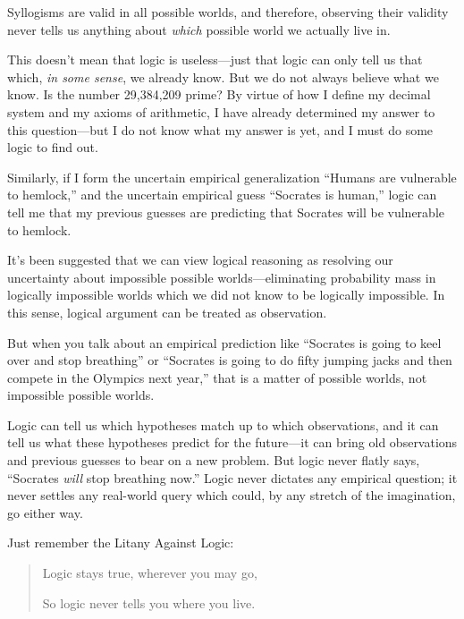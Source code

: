{{{
 Syllogisms are valid in all possible worlds, and therefore,
observing their validity never tells us anything about \textit{which}
possible world we actually live in.}

{
 This doesn't mean that logic is useless---just
that logic can only tell us that which, \textit{in some sense}, we
already know. But we do not always believe what we know. Is the number
29,384,209 prime? By virtue of how I define my decimal system and my
axioms of arithmetic, I have already determined my answer to this
question---but I do not know what my answer is yet, and I must do some
logic to find out.}

{
 Similarly, if I form the uncertain empirical generalization
``Humans are vulnerable to
hemlock,'' and the uncertain empirical guess
``Socrates is human,'' logic can
tell me that my previous guesses are predicting that Socrates will be
vulnerable to hemlock.}

{
 It's been suggested that we can view logical
reasoning as resolving our uncertainty about impossible possible
worlds---eliminating probability mass in logically impossible worlds
which we did not know to be logically impossible. In this sense,
logical argument can be treated as observation.}

{
 But when you talk about an empirical prediction like
``Socrates is going to keel over and stop
breathing'' or ``Socrates is going
to do fifty jumping jacks and then compete in the Olympics next
year,'' that is a matter of possible worlds, not
impossible possible worlds.}

{
 Logic can tell us which hypotheses match up to which observations,
and it can tell us what these hypotheses predict for the future---it
can bring old observations and previous guesses to bear on a new
problem. But logic never flatly says, ``Socrates
\textit{will} stop breathing now.'' Logic never
dictates any empirical question; it never settles any real-world query
which could, by any stretch of the imagination, go either way.}

{
 Just remember the Litany Against Logic:}

\begin{quote}
{
 Logic stays true, wherever you may go,}

{
  So logic never tells you where you live.}
\end{quote}

\myendsectiontext


}}
